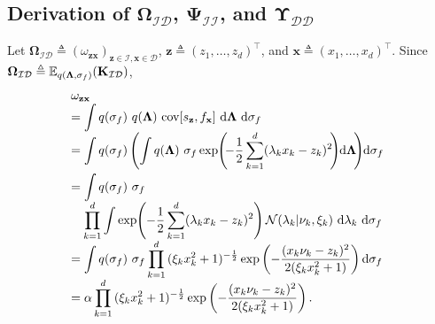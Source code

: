 \documentclass[conference]{IEEEtran}
\begin{document}
	\vspace{-5mm}
	\subsection{Derivation of $\mathbf{\Omega}_\mathcal{ID}$, $\mathbf{\Psi}_\mathcal{II}$, and $\mathbf{\Upsilon}_\mathcal{DD}$}
	\label{Derivation of Omega, Psi and Upsilon}	
	Let $\mathbf{\Omega}_\mathcal{ID}\triangleq (\omega_{\mathbf{z}\mathbf{x}})_{\mathbf{z}\in\mathcal{I},\mathbf{x}\in\mathcal{D}}$, $\mathbf{z}\triangleq (z_1,\ldots,z_d)^\top$, and $\mathbf{x}\triangleq (x_1,\ldots,x_d)^\top$. Since $\mathbf{\Omega}_\mathcal{ID}\hspace{-0mm}\triangleq\hspace{-0mm}\mathbb{E}_{q(\mathbf{\Lambda},\sigma_f)}\hspace{-0mm}(\mathbf{K}_{\mathcal{ID}})$, 
	\begin{equation*}
		\hspace{-1.7mm}
		\begin{array}{l}
			\omega_{\mathbf{z}\mathbf{x}}\\
			\displaystyle=\int q(\sigma_f)\ q(\mathbf{\Lambda})\ \mathrm{cov}[s_\mathbf{z},f_\mathbf{x}]\ \mathrm{d}\mathbf{\Lambda}\ \mathrm{d}\sigma_f\\
			\displaystyle=\int q(\sigma_f)\left(\int q(\mathbf{\Lambda})\ \sigma_f \exp\hspace{-0.7mm}\left(\hspace{-0.7mm}-\dfrac{1}{2}\sum_{k=1}^{d}(\lambda_k x_{k}-{z}_{k})^2\hspace{-0.7mm}\right) \hspace{-0.7mm}\mathrm{d}\mathbf{\Lambda}\hspace{-0.7mm}\right)\hspace{-0.7mm}\mathrm{d}\sigma_f \vspace{1mm}\\
			\displaystyle=\int q(\sigma_f)\ \sigma_f\\
			\displaystyle\quad \prod_{k=1}^{d}\int \exp\hspace{-0.7mm}\left(-\dfrac{1}{2}\sum_{k=1}^{d}(\lambda_k x_{k}-{z}_{k})^2\right)\mathcal{N}(\lambda_k|\nu_k,\xi_k)\ \mathrm{d}\lambda_k\ \mathrm{d}\sigma_f \\
			\displaystyle =\int q(\sigma_f)\ \sigma_f \prod_{k=1}^{d}{(\xi_kx_{k}^2+1)^{-\frac{1}{2}}}\exp\left(-\frac{(x_{k}\nu_k-z_{k})^2}{2(\xi_kx_{k}^2+1)}\right)\mathrm{d}\sigma_f \\
			\displaystyle =\alpha \prod_{k=1}^{d}{(\xi_kx_{k}^2+1)^{-\frac{1}{2}}}\exp\left(-\frac{(x_{k}\nu_k-z_{k})^2}{2(\xi_kx_{k}^2+1)}\right).
		\end{array}
	\end{equation*}
\end{document}
